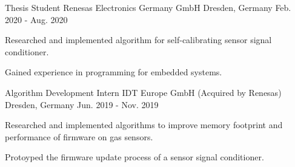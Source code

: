 

\begin{cventries}

\cventry
{Thesis Student} %
{Renesas Electronics Germany GmbH} %
{Dresden, Germany} %
{Feb. 2020 - Aug. 2020} %
{
  \begin{cvitems} %
    \item {Researched and implemented algorithm for self-calibrating sensor signal conditioner.}
    \item {Gained experience in programming for embedded systems.}
  \end{cvitems}
}
\cventry
{Algorithm Development Intern} %
{IDT Europe GmbH (Acquired by Renesas)} %
{Dresden, Germany} %
{Jun. 2019 - Nov. 2019} %
{
  \begin{cvitems} %
    \item {Researched and implemented algorithms to improve memory footprint and performance of firmware on gas sensors.}
    \item {Protoyped the firmware update process of a sensor signal conditioner.}
  \end{cvitems}
}

\end{cventries}
